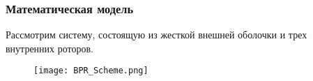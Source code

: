 \begin{frame}%
	\frametitle{Математическая модель}
		\qquad Рассмотрим систему, состоящую из жесткой внешней оболочки и трех внутренних роторов. 
		
		\begin{figure}[h]
			\begin{center}
				\texttt{[image: BPR\_Scheme.png]}				
			\end{center}
		\end{figure}		
		
		\begin{itemize}
			
			
			
			
%			
			

\end{itemize}
\end{frame}
